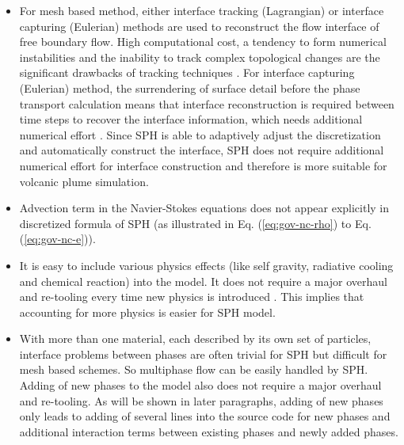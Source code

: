 \documentclass[journal abbreviation, manuscript]{copernicus}
\begin{document}
\begin{itemize}
\item For mesh based method, either interface tracking (Lagrangian) \citep{harlow1965numerical, wrobel1991computational, cheng1995simplified} or interface capturing (Eulerian) \citep{hirt1981volume, youngs1982time, gerlach2006comparison, gopala2008volume} methods are used to reconstruct the flow interface of free boundary flow. High computational cost, a tendency to form numerical instabilities and the inability to track complex topological changes are the significant drawbacks of tracking techniques \citep{hirt1981volume, unverdi1992front, anderson1998diffuse}. For interface capturing (Eulerian) method, the surrendering of surface detail before the phase transport calculation means that interface reconstruction is required between time steps to recover the interface information, which needs additional numerical effort \citep{hirt1981volume, youngs1982time}. Since SPH is able to adaptively adjust the discretization and automatically construct the interface, SPH does not require additional numerical effort for interface construction and therefore is more suitable for volcanic plume simulation.
\item Advection term in the Navier-Stokes equations does not appear explicitly in discretized formula of SPH (as illustrated in Eq. (\ref{eq:gov-nc-rho}) to Eq. (\ref{eq:gov-nc-e})).
\item It is easy to include various physics effects (like self gravity, radiative cooling and chemical reaction) into the model. It does not require a major overhaul and re-tooling every time new physics is introduced \citep{monaghan1995sph}. This implies that accounting for more physics is easier for SPH model.
\item With more than one material, each described by its own set of particles, interface problems between phases are often trivial for SPH but difficult for mesh based schemes. So multiphase flow can be easily handled by SPH. Adding of new phases to the model also does not require a major overhaul and re-tooling. As will be shown in later paragraphs, adding of new phases only leads to adding of several lines into the source code for new phases and additional interaction terms between existing phases and newly added phases.
\end{itemize}
\end{document}
